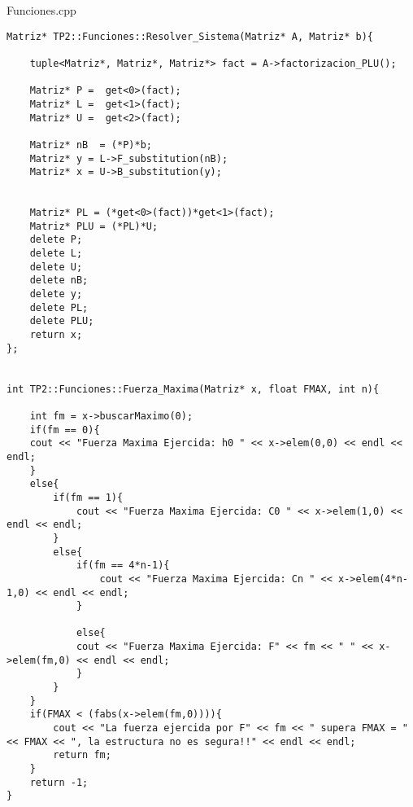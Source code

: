{\Large Funciones.cpp}
\begin{lstlisting}
Matriz* TP2::Funciones::Resolver_Sistema(Matriz* A, Matriz* b){
	
	tuple<Matriz*, Matriz*, Matriz*> fact = A->factorizacion_PLU();
	
	Matriz* P =  get<0>(fact);	
	Matriz* L =  get<1>(fact);
	Matriz* U =  get<2>(fact);

	Matriz* nB  = (*P)*b;
	Matriz* y = L->F_substitution(nB);
	Matriz* x = U->B_substitution(y);
	
	
	Matriz* PL = (*get<0>(fact))*get<1>(fact);
	Matriz* PLU = (*PL)*U;	
	delete P;
	delete L;
	delete U;
	delete nB;
	delete y;
	delete PL;
	delete PLU;	
	return x;	
};


int TP2::Funciones::Fuerza_Maxima(Matriz* x, float FMAX, int n){
	
	int fm = x->buscarMaximo(0);
	if(fm == 0){
	cout << "Fuerza Maxima Ejercida: h0 " << x->elem(0,0) << endl << endl;
	}
	else{
		if(fm == 1){
			cout << "Fuerza Maxima Ejercida: C0 " << x->elem(1,0) << endl << endl;	
		}
		else{
			if(fm == 4*n-1){			
				cout << "Fuerza Maxima Ejercida: Cn " << x->elem(4*n-1,0) << endl << endl;						
			}
			
			else{			
			cout << "Fuerza Maxima Ejercida: F" << fm << " " << x->elem(fm,0) << endl << endl;					
			}
		}
	}
	if(FMAX < (fabs(x->elem(fm,0)))){
		cout << "La fuerza ejercida por F" << fm << " supera FMAX = " << FMAX << ", la estructura no es segura!!" << endl << endl;
		return fm;
	}
	return -1;
}
\end{lstlisting}

